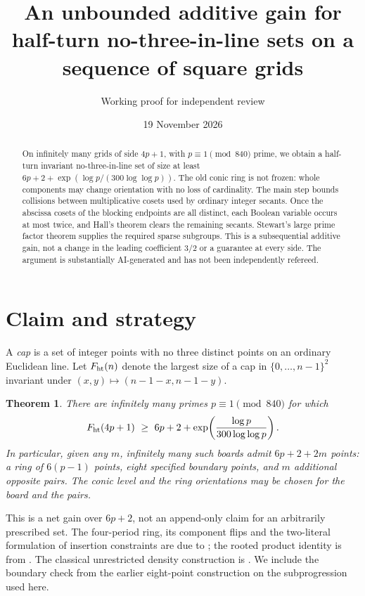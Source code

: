 \documentclass[11pt]{article}
\title{An unbounded additive gain for half-turn no-three-in-line sets on a sequence of square grids}
\author{Working proof for independent review}\date{19 November 2026}
\newtheorem{theorem}{Theorem}\newtheorem{lemma}[theorem]{Lemma}\newtheorem{proposition}[theorem]{Proposition}
\begin{document}
\maketitle
\begin{abstract}
On infinitely many grids of side $4p+1$, with $p\equiv1\pmod{840}$ prime, we obtain a half-turn invariant no-three-in-line set of size at least $6p+2+\exp(\log p/(300\log\log p))$. The old conic ring is not frozen: whole components may change orientation with no loss of cardinality. The main step bounds collisions between multiplicative cosets used by ordinary integer secants. Once the abscissa cosets of the blocking endpoints are all distinct, each Boolean variable occurs at most twice, and Hall's theorem clears the remaining secants. Stewart's large prime factor theorem supplies the required sparse subgroups. This is a subsequential additive gain, not a change in the leading coefficient $3/2$ or a guarantee at every side. The argument is substantially AI-generated and has not been independently refereed.
\end{abstract}

\section{Claim and strategy}
A \emph{cap} is a set of integer points with no three distinct points on an ordinary Euclidean line. Let $F_{\mathrm{ht}}(n)$ denote the largest size of a cap in $\{0,\ldots,n-1\}^2$ invariant under $(x,y)\mapsto(n-1-x,n-1-y)$.
\begin{theorem}\label{thm:main} There are infinitely many primes $p\equiv1\pmod{840}$ for which
\[
 \htf(4p+1)\ \ge\ 6p+2+\exp\!\left(\frac{\log p}{300\log\log p}\right).
\]
In particular, given any $m$, infinitely many such boards admit $6p+2+2m$ points: a ring of $6(p-1)$ points, eight specified boundary points, and $m$ additional opposite pairs. The conic level and the ring orientations may be chosen for the board and the pairs.
\end{theorem}
This is a net gain over $6p+2$, not an append-only claim for an arbitrarily prescribed set. The four-period ring, its component flips and the two-literal formulation of insertion constraints are due to \cite{ring}; the rooted product identity is from \cite{root}. The classical unrestricted density construction is \cite{hjsw}. We include the boundary check from the earlier eight-point construction \cite{boundary} on the subprogression used here.
\end{document}
